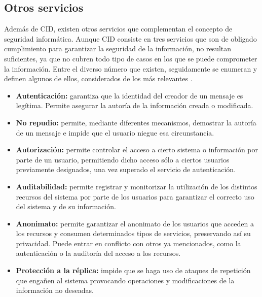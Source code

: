 \subsection{Otros servicios}

Además de CID, existen otros servicios que complementan el concepto de seguridad informática. Aunque CID consiste en tres servicios que son de obligado cumplimiento para garantizar la seguridad de la información, no resultan suficientes, ya que no cubren todo tipo de casos en los que se puede comprometer la información. Entre el diverso número que existen, seguidamente se enumeran y definen algunos de ellos, considerados de los más relevantes \cite{apuntes-isma}.

\begin{itemize}
	\item \textbf{Autenticación:} garantiza que la identidad del creador de un mensaje es legítima. Permite asegurar la autoría de la información creada o modificada.
	\item \textbf{No repudio:} permite, mediante diferentes mecanismos, demostrar la autoría de un mensaje e impide que el usuario niegue esa circunstancia.
	\item \textbf{Autorización:} permite controlar el acceso a cierto sistema o información por parte de un usuario, permitiendo dicho acceso sólo a ciertos usuarios previamente designados, una vez superado el servicio de autenticación. 
	\item \textbf{Auditabilidad:} permite registrar y monitorizar la utilización de los distintos recursos del sistema por parte de los usuarios para garantizar el correcto uso del sistema y de su información.
	\item \textbf{Anonimato:} permite garantizar el anonimato de los usuarios que acceden a los recursos y consumen determinados tipos de servicios, preservando así su privacidad. Puede entrar en conflicto con otros ya mencionados, como la autenticación o la auditoría del acceso a los recursos.
	\item \textbf{Protección a la réplica:} impide que se haga uso de ataques de repetición que engañen al sistema provocando operaciones y modificaciones de la información no deseadas.
\end{itemize}
